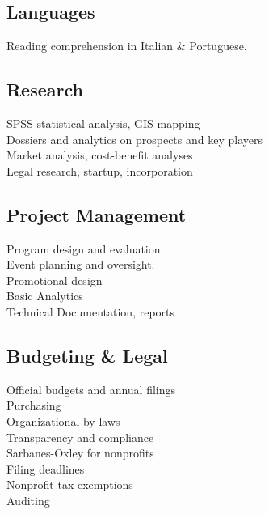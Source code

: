 \begin{minipage}[t]{.45\textwidth}
    \subsection{Languages}
        \textbullet{} 
		\textbullet{} Reading comprehension in Italian \& Portuguese.\\
    \sectionsep
	\subsection{Research}
    	\textbullet{} SPSS statistical analysis, GIS mapping \\
    	\textbullet{} Dossiers and analytics on prospects and key players \\
        \textbullet{} Market analysis, cost-benefit analyses \\
        \textbullet{} Legal research, startup, incorporation\\
    \sectionsep
     \subsection{Project Management}
        \textbullet{} Program design and evaluation.\\
		\textbullet{} Event planning and oversight.\\
        \textbullet{} Promotional design\\
        \textbullet{} Basic Analytics \\
        \textbullet{} Technical Documentation, reports\\
    \sectionsep
    \subsection{Budgeting \& Legal}
        \textbullet{} Official budgets and annual filings\\
        \textbullet{} Purchasing\\
		\textbullet{} Organizational by-laws\\
        \textbullet{} Transparency and compliance\\
        \textbullet{} Sarbanes-Oxley for nonprofits\\
		\textbullet{} Filing deadlines\\
        \textbullet{} Nonprofit tax exemptions\\
  	    \textbullet{} Auditing
    \sectionsep
\end{minipage}
\sectionsep
\sectionsep
